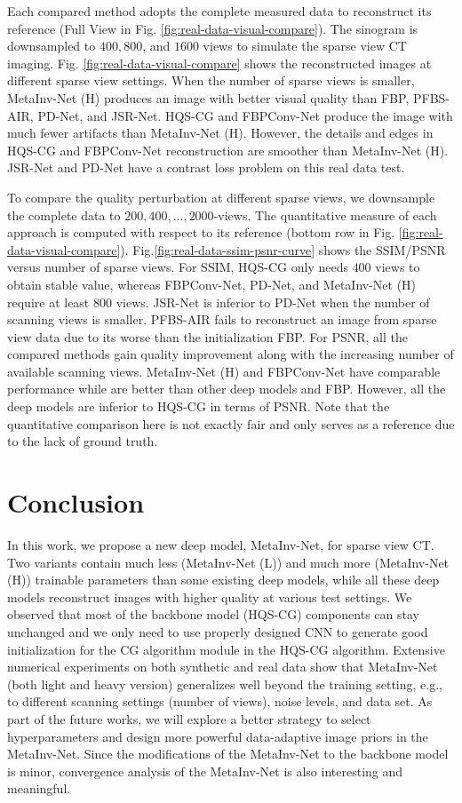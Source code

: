 \documentclass[journal,twoside]{IEEEtran}
\begin{document}
Each compared method adopts the complete measured data to reconstruct its reference (Full View in Fig. \ref{fig:real-data-visual-compare}). The sinogram is downsampled to $400, 800$, and $1600$ views to simulate the sparse view CT imaging. Fig. \ref{fig:real-data-visual-compare} shows the reconstructed images at different sparse view settings.
When the number of sparse views is smaller, MetaInv-Net (H) produces an image with better visual quality than FBP, PFBS-AIR, PD-Net, and JSR-Net. HQS-CG and FBPConv-Net produce the image with much fewer artifacts than MetaInv-Net (H). However, the details and edges in HQS-CG and FBPConv-Net reconstruction are smoother than MetaInv-Net (H). JSR-Net and PD-Net have a contrast loss problem on this real data test.


To compare the quality perturbation at different sparse views, we downsample the complete data to $200, 400, ..., 2000$-views. The quantitative measure of each approach is computed with respect to its reference (bottom row in Fig. \ref{fig:real-data-visual-compare}). Fig.\ref{fig:real-data-ssim-psnr-curve} shows the SSIM/PSNR versus number of sparse views. For SSIM, HQS-CG only needs $400$ views to obtain stable value, whereas FBPConv-Net, PD-Net, and MetaInv-Net (H) require at least $800$ views. JSR-Net is inferior to PD-Net when the number of scanning views is smaller. PFBS-AIR fails to reconstruct an image from sparse view data due to its worse than the initialization FBP. For PSNR, all the compared methods gain quality improvement along with the increasing number of available scanning views. MetaInv-Net (H) and FBPConv-Net have comparable performance while are better than other deep models and FBP. However, all the deep models are inferior to HQS-CG in terms of PSNR. Note that the quantitative comparison here is not exactly fair and only serves as a reference due to the lack of ground truth.


\section{Conclusion}\label{sec:conclusion}
In this work, we propose a new deep model, MetaInv-Net, for sparse view CT. Two variants contain much less (MetaInv-Net (L)) and much more (MetaInv-Net (H)) trainable parameters than some existing deep models, while all these deep models reconstruct images with higher quality at various test settings. We observed that most of the backbone model (HQS-CG) components can stay unchanged and we only need to use properly designed CNN to generate good initialization for the CG algorithm module in the HQS-CG algorithm. Extensive numerical experiments on both synthetic and real data show that MetaInv-Net (both light and heavy version) generalizes well beyond the training setting, e.g., to different scanning settings (number of views), noise levels, and data set. As part of the future works, we will explore a better strategy to select hyperparameters and design more powerful data-adaptive image priors in the MetaInv-Net. Since the modifications of the MetaInv-Net to the backbone model is minor, convergence analysis of the MetaInv-Net is also interesting and meaningful.
\end{document}

